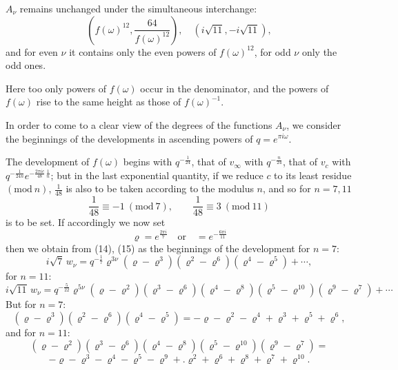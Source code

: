 
$A_\nu$ remains unchanged under the simultaneous interchange:
\[
\left( f(\omega)^{12}, \frac{64}{f(\omega)^{12}} \right), \quad
\left( i\sqrt{11}, -i\sqrt{11} \right),
\]
and for even $\nu$ it contains only the even powers of
$f(\omega)^{12}$, for odd $\nu$ only the odd ones.

Here too only powers of $f(\omega)$ occur in the denominator, and the
powers of $f(\omega)$ rise to the same height as those of
$f(\omega)^{-1}$.

In order to come to a clear view of the degrees of the functions
$A_\nu$, we consider the beginnings of the developments in ascending
powers of $q = e^{\pi i \omega}$.

The development of $f(\omega)$ begins with $q^{-\frac{1}{24}}$, that
of $v_\infty$ with $q^{-\frac{n}{24}}$, that of $v_c$ with
$q^{-\frac{1}{24n}} e^{-\frac{2\pi i c}{48}\, \frac{1}{n}}$; but in
the last exponential quantity, if we reduce $c$ to its least residue
$(\mathrm{mod}\ n)$, $\frac{1}{48}$ is also to be taken according to
the modulus $n$, and so for $n = 7, 11$
\[
\frac{1}{48} \equiv -1 \ (\mathrm{mod}\ 7), \qquad
\frac{1}{48} \equiv 3 \ (\mathrm{mod}\ 11)
\]
is to be set. If accordingly we now set
\[
\varrho = e^{\frac{2\pi i}{7}} \quad \text{or} \quad = e^{-\frac{6\pi i}{11}}
\]
then we obtain from (14), (15) as the beginnings of the development
for $n=7$:
\[
i\sqrt{7}\, w_\nu = q^{-\frac{1}{7}} \varrho^{3\nu} (\varrho - \varrho^3)(\varrho^2 - \varrho^6)(\varrho^4 - \varrho^5) + \cdots,
\]
for $n=11$:
\[
i\sqrt{11}\, w_\nu = q^{-\frac{5}{22}} \varrho^{5\nu} (\varrho - \varrho^2)(\varrho^3 - \varrho^6)(\varrho^4 - \varrho^8)(\varrho^5 - \varrho^{10})(\varrho^9 - \varrho^7) + \cdots
\]
But for $n = 7$:
\[
(\varrho - \varrho^3)(\varrho^2 - \varrho^6)(\varrho^4 - \varrho^5) = -\varrho - \varrho^2 - \varrho^4 + \varrho^3 + \varrho^5 + \varrho^6,
\]
and for $n = 11$:
\[
(\varrho - \varrho^2)(\varrho^3 - \varrho^6)(\varrho^4 - \varrho^8)(\varrho^5 - \varrho^{10})(\varrho^9 - \varrho^7) =
\]
\[
-\varrho - \varrho^3 - \varrho^4 - \varrho^5 - \varrho^9 +.\varrho^2 + \varrho^6 + \varrho^8 + \varrho^7 + \varrho^{10}. %
\]
